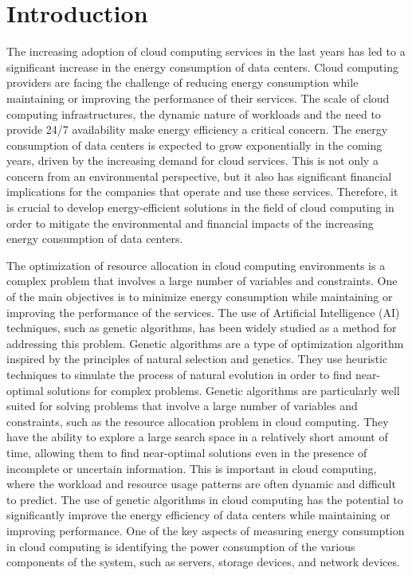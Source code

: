 \section{Introduction}\label{sect:intro}

The increasing adoption of cloud computing services in the last years has led to a significant increase in the energy consumption of data centers. 
Cloud computing providers are facing the challenge of reducing energy consumption while maintaining or improving the performance of their services. 
The scale of cloud computing infrastructures, the dynamic nature of workloads and the need to provide 24/7 availability make energy efficiency a critical concern. 
The energy consumption of data centers is expected to grow exponentially in the coming years, driven by the increasing demand for cloud services. 
This is not only a concern from an environmental perspective, but it also has significant financial implications for the companies that operate and use these services. 
Therefore, it is crucial to develop energy-efficient solutions in the field of cloud computing in order to mitigate the environmental and financial impacts 
of the increasing energy consumption of data centers.

The optimization of resource allocation in cloud computing environments is a complex problem that involves a large number of variables and constraints. 
One of the main objectives is to minimize energy consumption while maintaining or improving the performance of the services. 
The use of Artificial Intelligence (AI) techniques, such as genetic algorithms, has been widely studied as a method for addressing this problem. 
Genetic algorithms are a type of optimization algorithm inspired by the principles of natural selection and genetics. 
They use heuristic techniques to simulate the process of natural evolution in order to find near-optimal solutions for complex problems.
Genetic algorithms are particularly well suited for solving problems that involve a large number of variables and constraints, 
such as the resource allocation problem in cloud computing. 
They have the ability to explore a large search space in a relatively short amount of time, allowing them to find near-optimal solutions even in the presence of incomplete or uncertain information. 
This is important in cloud computing, where the workload and resource usage patterns are often dynamic and difficult to predict.
The use of genetic algorithms in cloud computing has the potential to significantly improve the energy efficiency of data centers while maintaining or improving performance.
One of the key aspects of measuring energy consumption in cloud computing is identifying the power consumption of the various components of the system, such as servers, storage devices, and network devices. 


